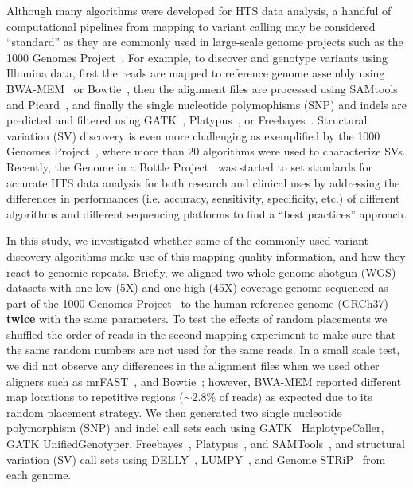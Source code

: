 \documentclass[10pt,a4paper]{article}
\begin{document}
Although many algorithms were developed for HTS data analysis, a handful of computational pipelines from mapping to variant calling may be considered ``standard'' as they are commonly used in large-scale genome projects such as the 1000 Genomes Project~\cite{1000GP,1000GP2012}. For example, to discover and genotype variants using Illumina data, first the reads are mapped to reference genome assembly using BWA-MEM~\cite{Li2009a,Li2013} or Bowtie~\cite{Langmead2009}, then the alignment files are processed using SAMtools~\cite{Li2009b} and Picard~\cite{picard}, and finally the single nucleotide polymophisms (SNP) and indels are predicted and filtered using GATK~\cite{DePristo2011}, Platypus~\cite{Rimmer2014}, or Freebayes~\cite{Garrison2012}. 
Structural variation (SV) discovery is even more challenging as exemplified by the 1000 Genomes Project~\cite{1000GP,1000GP2012,Mills2011}, where more than 20 algorithms were used to characterize SVs.
Recently, the Genome in a Bottle Project~\cite{Zook2014} was started to set standards for accurate HTS data analysis for both research and clinical uses by addressing the differences in performances (i.e. accuracy, sensitivity, specificity, etc.) of different algorithms and different sequencing platforms
 to find a ``best practices'' approach.

In this study, we investigated whether some of the commonly used variant discovery algorithms
make use of this mapping quality information, and how they react to genomic repeats.
Briefly, 
we aligned two whole genome shotgun (WGS) datasets with one low (5X) and one high (45X) coverage genome
sequenced as part of the 1000 Genomes Project~\cite{1000GP2012} to the human reference genome (GRCh37) {\bf twice} with the same parameters. 
To test the effects of random placements 
we shuffled the order of reads in the second mapping experiment to make sure that the same random numbers are not used for the same reads. 
In a small scale test, we did not observe any differences
in the alignment files when we used other aligners such as mrFAST~\cite{Alkan2009,Xin2013}, and Bowtie~\cite{Langmead2009}; however, 
BWA-MEM reported different map locations to repetitive regions ($\sim$2.8\% of reads) as expected due to its random placement strategy.
We then generated two single nucleotide polymorphism (SNP) and indel call sets each using GATK~\cite{DePristo2011} HaplotypeCaller, GATK UnifiedGenotyper, Freebayes~\cite{Garrison2012}, Platypus~\cite{Rimmer2014}, and SAMTools~\cite{Li2009b}, and structural variation (SV) call sets using DELLY~\cite{Rausch2012}, LUMPY~\cite{Layer2014}, and Genome STRiP~\cite{Handsaker2011,Handsaker2015} from each genome.
\end{document}

